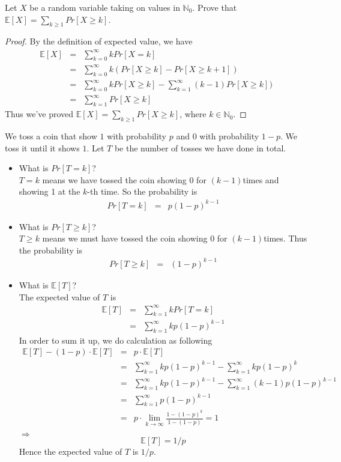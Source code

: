 \exercise{}
Let	$X$ be a random variable taking on values in $\mathbb{N}_0$. Prove that $\mathbb{E}[X] = \sum_{k \geq 1} Pr[X \geq k]$.
	\begin{proof}
		By the definition of expected value, we have
		\begin{eqnarray*}
			\mathbb{E}[X] &= &\sum_{k = 0}^{\infty}kPr[X=k]\\
			&= &\sum_{k = 0}^{\infty}k(Pr[X\geq k] - Pr[X \geq k + 1])\\
			&= &\sum_{k = 0}^{\infty}kPr[X\geq k] - \sum_{k = 1}^{\infty}(k- 1)Pr[X \geq k])\\
			&= &\sum_{k = 1}^{\infty} Pr[X \geq k]
		\end{eqnarray*}
		Thus we've proved $\mathbb{E}[X] = \sum_{k \geq 1} Pr[X \geq k]$, where $k \in \mathbb{N}_0$.
	\end{proof}
\exercise{}
We toss a coin that show $1$ with probability $p$ and $0$ with probability $1-p$. We toss it until it shows $1$. Let $T$ be the number of tosses we have done in total.
\begin{itemize}
	\item What is $Pr[T = k]$?\\
	$T=k$ means we have tossed the coin showing 0 for $(k-1)$times and showing 1 at the $k$-th time. So the probability is
		\begin{eqnarray*}
			Pr[T = k] &= &p(1-p)^{k-1}
		\end{eqnarray*}
	\item What is $Pr[T \geq k]$?\\
	$T \geq k$ means we must have tossed the coin showing 0 for $(k-1)$times. Thus the probability is
		\begin{eqnarray*}
			Pr[T \geq k] &= &(1-p)^{k-1}
		\end{eqnarray*}
	\item What is $\mathbb{E}[T]$?\\
		The expected value of $T$ is
		\begin{eqnarray*}
			\mathbb{E}[T] &= &\sum_{k=1}^{\infty}k Pr[T = k]\\
			&= &\sum_{k = 1}^{\infty} kp(1-p)^{k-1}
		\end{eqnarray*}
		In order to sum it up, we do calculation as following
		\begin{eqnarray*}
			\mathbb{E}[T] - (1 - p)\cdot\mathbb{E}[T] 
			&= &p\cdot\mathbb{E}[T]\\
			&= &\sum_{k = 1}^{\infty} kp(1-p)^{k-1} - \sum_{k = 1}^{\infty} kp(1-p)^{k}\\
			&= &\sum_{k = 1}^{\infty} kp(1-p)^{k-1} - \sum_{k = 1}^{\infty} (k-1)p(1-p)^{k - 1}\\
			&= &\sum_{k = 1}^{\infty} p(1-p)^{k-1}\\
			&= &p\cdot \lim\limits_{k\rightarrow \infty} \frac{1 - (1-p)^k}{1 - (1 - p)} = 1\\
		\end{eqnarray*}
		$\Rightarrow$
		\[\mathbb{E}[T] = 1 / p\]
		Hence the expected value of $T$ is $1/p$.
\end{itemize}
